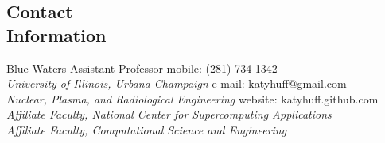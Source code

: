 \documentclass[margin,line]{resume}
\begin{document}
\begin{resume}

%


    \section{\mysidestyle Contact\\Information}
    Blue Waters Assistant Professor \hfill mobile: (281) 734-1342 \vspace{0mm}\\\vspace{0mm}%
        \textsl{University of Illinois, Urbana-Champaign}
        \hfill e-mail: katyhuff@gmail.com            \vspace{0mm}\\\vspace{0mm}%
    \textsl{Nuclear, Plasma, and Radiological Engineering}
        \hfill website: katyhuff.github.com     \vspace{0mm}\\\vspace{0mm}%
    \textsl{Affiliate Faculty, National Center for Supercomputing Applications}           \vspace{0mm}\\\vspace{0mm}%
    \textsl{Affiliate Faculty, Computational Science and Engineering}           \vspace{0mm}\\\vspace{-4.5mm}%


\end{resume}
\end{document}
